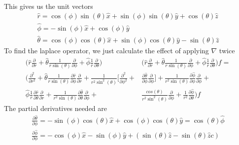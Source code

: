 \documentclass{article}
\begin{document}
    This gives us the unit vectors
    \begin{align*}
        \hat r = \cos (\phi) \sin(\theta) \hat x + \sin (\phi) \sin(\theta) \hat y + \cos (\theta) \hat z \\
        \hat \phi = - \sin{(\phi)} \hat x + \cos{(\phi)} \hat y \\
        \hat \theta =  \cos(\phi) \cos(\theta) \hat x + \sin(\phi)\cos(\theta) \hat y - \sin(\theta) \hat z
    \end{align*}
    To find the laplace operator, we just calculate the effect of applying \(\nabla\) twice
    \begin{align*}
        \bigg( \hat r \frac{\partial }{\partial r} + \hat \theta \frac{1}{r \sin(\theta)} \frac{\partial}{\partial \phi} + \hat \phi \frac{1}{r} \frac{\partial}{\partial \theta} \bigg) & \bigg( \hat r \frac{\partial }{\partial r} + \hat \theta \frac{1}{r \sin(\theta)} \frac{\partial}{\partial \phi} + \hat \phi \frac{1}{r} \frac{\partial}{\partial \theta} \bigg) f = \\
        \bigg( \frac{\partial^2}{\partial r^2} +  \hat \theta \frac{1}{r \sin(\theta)}\frac{\partial \hat r}{\partial \phi}\frac{\partial}{\partial r} +  \frac{1}{r^2 \sin^2(\theta)} \bigg[\frac{\partial ^2}{\partial \phi^2} + & \frac{\partial \hat \theta}{\partial \phi}\frac{\partial }{\partial \phi}\bigg] + \frac{1}{r^2 \sin(\theta)}\frac{\partial \hat \phi}{\partial \phi} \frac{\partial}{\partial \phi} + \\ \hat \phi \frac{1}{r}\frac{\partial \hat r}{\partial \theta} \frac{\partial}{\partial r} + \frac{1}{r^2 \sin(\theta)} \frac{\partial \hat \theta}{\partial \theta}\frac{\partial}{\partial \phi} + &\frac{cos(\theta)}{r^2 \sin^2(\theta)}\frac{\partial}{\partial \phi} + \frac{1}{r^2}\frac{\partial \hat \phi}{\partial \theta} \bigg) f
    \end{align*}
    The partial derivatives needed are
    \begin{align*}
        \frac{\partial \hat \theta}{\partial \phi} = -\sin(\phi) \cos(\theta) \hat x + \cos(\phi)\cos(\theta) \hat y = \cos(\theta) \hat \phi \\ 
        \frac{\partial \hat \phi}{\partial \phi} = - \cos{(\phi)} \hat x - \sin{(\phi)} \hat y + (\sin(\theta)\hat z - \sin(\theta)\hat z c )
    \end{align*}
\end{document}
